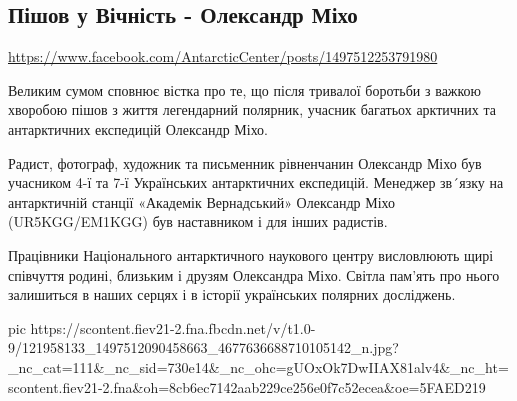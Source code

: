  


\subsection{Пішов у Вічність - Олександр Міхо}
\label{sec:16_10_2020.fb.ukr_antarctic_centre.2.death.oleksandr_miho}

\url{https://www.facebook.com/AntarcticCenter/posts/1497512253791980}


Великим сумом сповнює вістка про те, що після тривалої боротьби з важкою
хворобою пішов з життя легендарний полярник, учасник багатьох арктичних та
антарктичних експедицій Олександр Міхо.

Радист, фотограф, художник та письменник рівненчанин Олександр Міхо був
учасником 4-ї та 7-ї Українських антарктичних експедицій. Менеджер зв´язку на
антарктичній станції «Академік Вернадський» Олександр Міхо (UR5KGG/EM1KGG) був
наставником і для інших радистів.

Працівники Національного антарктичного наукового центру висловлюють щирі
співчуття родині, близьким і друзям Олександра Міхо. Світла пам'ять про нього
залишиться в наших серцях і в історії українських полярних досліджень.

\ifcmt
pic https://scontent.fiev21-2.fna.fbcdn.net/v/t1.0-9/121958133_1497512090458663_4677636688710105142_n.jpg?_nc_cat=111&_nc_sid=730e14&_nc_ohc=gUOxOk7DwIIAX81alv4&_nc_ht=scontent.fiev21-2.fna&oh=8cb6ec7142aab229ce256e0f7c52ecea&oe=5FAED219
\fi
